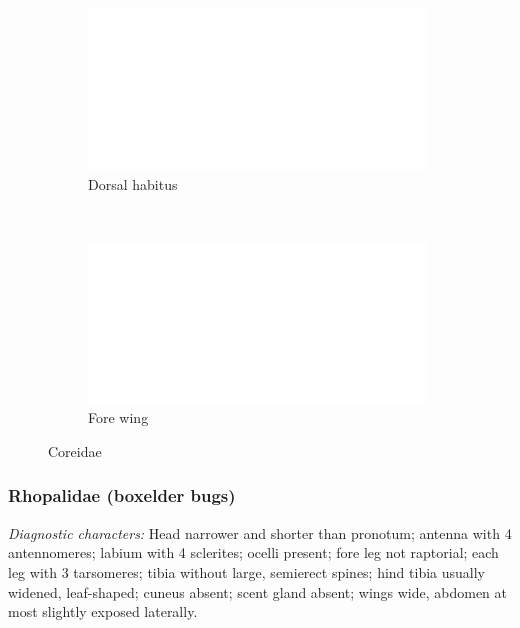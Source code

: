 \documentclass[letterpaper, 11pt]{article}
\begin{document}
\begin{figure}[ht!]
 \centering
 \begin{subfigure}[ht!]{0.35\textwidth}
  \includegraphics[width=\textwidth]{image14}
  \caption{Dorsal habitus}
  \label{fig:coreid1}
 \end{subfigure}
 ~ %
 \begin{subfigure}[ht!]{0.55\textwidth}
  \includegraphics[width=\textwidth]{image14}
  \caption{Fore wing}
  \label{fig:coreidwing}
 \end{subfigure}
 \caption{Coreidae}\label{fig:coreidae}
\end{figure}

\subsubsection{Rhopalidae (boxelder bugs)}
\noindent{}\textit{Diagnostic characters:} Head narrower and shorter than pronotum; antenna with 4 antennomeres; labium with 4 sclerites; ocelli present; fore leg not raptorial; each leg with 3 tarsomeres; tibia without large, semierect spines; hind tibia usually widened, leaf-shaped; cuneus absent; scent gland absent; wings wide, abdomen at most slightly exposed laterally.\\
\end{document}
